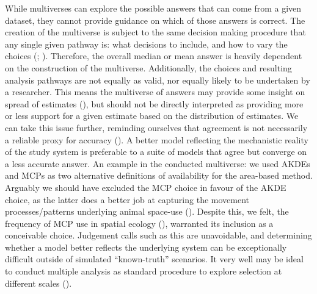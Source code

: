 \documentclass[10pt,a4paper]{article}
\begin{document}
While multiverses can explore the possible answers that can come from a given dataset, they cannot provide guidance on which of those answers is correct.
The creation of the multiverse is subject to the same decision making procedure that any single given pathway is: what decisions to include, and how to vary the choices (; ).
Therefore, the overall median or mean answer is heavily dependent on the construction of the multiverse.
Additionally, the choices and resulting analysis pathways are not equally as valid, nor equally likely to be undertaken by a researcher.
This means the multiverse of answers may provide some insight on spread of estimates (), but should not be directly interpreted as providing more or less support for a given estimate based on the distribution of estimates.
We can take this issue further, reminding ourselves that agreement is not necessarily a reliable proxy for accuracy ().
A better model reflecting the mechanistic reality of the study system is preferable to a suite of models that agree but converge on a less accurate answer.
An example in the conducted multiverse: we used AKDEs and MCPs as two alternative definitions of availability for the area-based method.
Arguably we should have excluded the MCP choice in favour of the AKDE choice, as the latter does a better job at capturing the movement processes/patterns underlying animal space-use ().
Despite this, we felt, the frequency of MCP use in spatial ecology (), warranted its inclusion as a conceivable choice.
Judgement calls such as this are unavoidable, and determining whether a model better reflects the underlying system can be exceptionally difficult outside of simulated ``known-truth'' scenarios.
It very well may be ideal to conduct multiple analysis as standard procedure to explore selection at different scales ().
\end{document}

